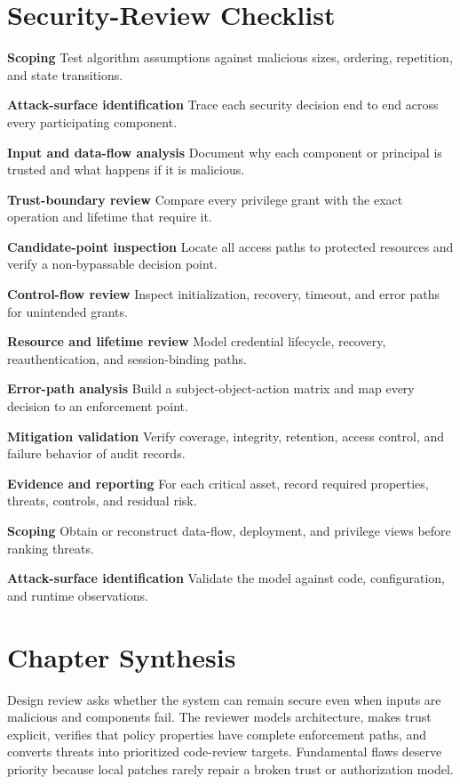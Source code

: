 \documentclass[11pt,letterpaper]{article}
\begin{document}
\section{Security-Review Checklist}
\begin{CornellChecklist}
\item \textbf{Scoping}
Test algorithm assumptions against malicious sizes, ordering, repetition, and state transitions.
\item \textbf{Attack-surface identification}
Trace each security decision end to end across every participating component.
\item \textbf{Input and data-flow analysis}
Document why each component or principal is trusted and what happens if it is malicious.
\item \textbf{Trust-boundary review}
Compare every privilege grant with the exact operation and lifetime that require it.
\item \textbf{Candidate-point inspection}
Locate all access paths to protected resources and verify a non-bypassable decision point.
\item \textbf{Control-flow review}
Inspect initialization, recovery, timeout, and error paths for unintended grants.
\item \textbf{Resource and lifetime review}
Model credential lifecycle, recovery, reauthentication, and session-binding paths.
\item \textbf{Error-path analysis}
Build a subject-object-action matrix and map every decision to an enforcement point.
\item \textbf{Mitigation validation}
Verify coverage, integrity, retention, access control, and failure behavior of audit records.
\item \textbf{Evidence and reporting}
For each critical asset, record required properties, threats, controls, and residual risk.
\item \textbf{Scoping}
Obtain or reconstruct data-flow, deployment, and privilege views before ranking threats.
\item \textbf{Attack-surface identification}
Validate the model against code, configuration, and runtime observations.
\end{CornellChecklist}
\section{Chapter Synthesis}
Design review asks whether the system can remain secure even when inputs are malicious and components fail. The reviewer models architecture, makes trust explicit, verifies that policy properties have complete enforcement paths, and converts threats into prioritized code-review targets. Fundamental flaws deserve priority because local patches rarely repair a broken trust or authorization model.
\end{document}
